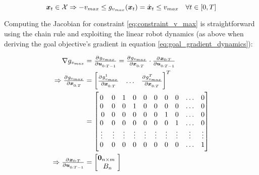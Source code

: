 \begin{equation}
\boldsymbol{x}_t \in \mathcal{X} \Rightarrow -v_{max} \leq g_{v_{max}}(\boldsymbol{x}_t) = \dot{\boldsymbol{x}}_t \leq v_{max} \quad \forall t \in [0, T]
\label{eq:constraint_v_max}
\end{equation}

Computing the Jacobian for constraint \ref{eq:constraint_v_max} is straightforward using the chain rule and exploiting the linear robot dynamics (as above when deriving the goal objective's gradient in equation \ref{eq:goal_gradient_dynamics}):  

\begin{align}
\nabla g_{v_{max}} &= \pd{g_{v_{max}}}{\u_{0:T-1}} = \pd{g_{v_{max}}}{\x_{0:T}} \cdot \pd{\x_{0:T}}{\u_{0:T-1}} \\
\Rightarrow \pd{g_{v_{max}}}{\x_{0:T}} &= \begin{bmatrix} \pd{g_{v_{max}}^1}{\x_{0:T}} & \hdots & \pd{g_{v_{max}}^T}{\x_{0:T}}\end{bmatrix}^T  \\
&= \begin{bmatrix} 
0 & 0 & 1 & 0 & 0 & 0 & 0 & 0 & \hdots & 0 \\ 
0 & 0 & 0 & 1 & 0 & 0 & 0 & 0 & \hdots & 0 \\  
0 & 0 & 0 & 0 & 0 & 0 & 1 & 0 & \hdots & 0 \\
0 & 0 & 0 & 0 & 0 & 0 & 0 & 1 & \hdots & 0 \\ 
\vdots & \vdots & \vdots & \vdots & \vdots & \vdots & \vdots & \vdots & \vdots & \vdots \\
0 & 0 & 0 & 0 & 0 & 0 & 0 & 0 & \hdots & 1 \end{bmatrix} \\
\Rightarrow \pd{\x_{0:T}}{\u_{0:T-1}} &= \begin{bmatrix} \mathbf{0}_{n \times m} \\ B_n \end{bmatrix}
\end{align}

